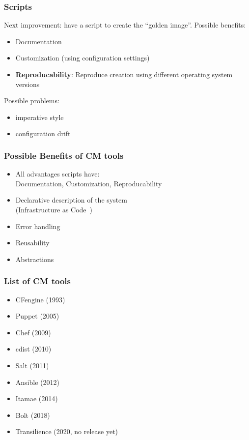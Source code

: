 \begin{frame}
	\frametitle{Scripts}

	Next improvement: have a script to create the ``golden image''.
	Possible benefits:

	\begin{itemize}[<+-| alert@+>]
	\item Documentation
	\item Customization (using configuration settings)
	\item \textbf{Reproducability}: Reproduce creation using different operating system versions
	\end{itemize}

	\pause[\thebeamerpauses]
	\vspace{1cm}
	Possible problems:

	\begin{itemize}[<+-| alert@+>]
	\item imperative style
	\item configuration drift
	\end{itemize}
\end{frame}

\begin{frame}
	\frametitle{Possible Benefits of CM tools}

	\begin{itemize}[<+-| alert@+>]
	\item All advantages scripts have: \\
		Documentation, Customization, Reproducability
	\item Declarative description of the system \\
		(Infrastructure as Code~\cite{waldemar2013testing})
	\item Error handling
	\item Reusability
	\item Abstractions
	\end{itemize}
\end{frame}

\begin{frame}
	\frametitle{List of CM tools}

	\begin{itemize}[<+-| alert@+>]
	\item CFengine (1993)
	\item Puppet (2005)
	\item Chef (2009)
	\item cdist (2010) %
	\item Salt (2011)
	\item Ansible (2012)
	\item Itamae (2014)
	\item Bolt (2018) %
	\item Transilience (2020, no release yet) %
	\end{itemize}
\end{frame}

